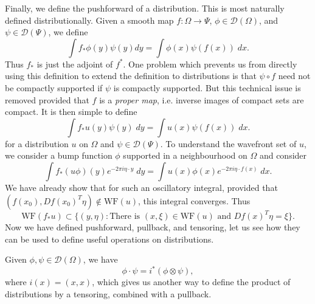 Finally, we define the pushforward of a distribution. This is most naturally defined distributionally. Given a smooth map $f: \Omega \to \Psi$, $\phi \in \mathcal{D}(\Omega)$, and $\psi \in \mathcal{D}(\Psi)$, we define
%
\[ \int f_* \phi(y) \psi(y) dy = \int \phi(x) \psi(f(x))\; dx. \]
%
Thus $f_*$ is just the adjoint of $f^*$. One problem which prevents us from directly using this definition to extend the definition to distributions is that $\psi \circ f$ need not be compactly supported if $\psi$ is compactly supported. But this technical issue is removed provided that $f$ is a \emph{proper map}, i.e. inverse images of compact sets are compact. It is then simple to define
%
\[ \int f_* u(y) \psi(y)\; dy = \int u(x) \psi(f(x))\; dx. \]
%
for a distribution $u$ on $\Omega$ and $\psi \in \mathcal{D}(\Psi)$. To understand the wavefront set of $u$, we consider a bump function $\phi$ supported in a neighbourhood  on $\Omega$ and consider
%
\[ \int f_*(u \phi)(y) e^{-2 \pi i \eta \cdot y}\; dy = \int u(x) \phi(x) e^{-2 \pi i \eta \cdot f(x)}\; dx. \]
%
We have already show that for such an oscillatory integral, provided that $(f(x_0),Df(x_0)^T \eta) \not \in \text{WF}(u)$, this integral converges. Thus
%
\[ \text{WF}(f_* u) \subset \{ (y,\eta) : \text{There is $(x,\xi) \in \text{WF}(u)$ and $Df(x)^T \eta = \xi$} \}. \]
%
Now we have defined pushforward, pullback, and tensoring, let us see how they can be used to define useful operations on distributions.

\begin{example}
    Given $\phi,\psi \in \mathcal{D}(\Omega)$, we have
    \[ \phi \cdot \psi = i^*(\phi \otimes \psi), \]
    where $i(x) = (x,x)$, which gives us another way to define the product of distributions by a tensoring, combined with a pullback.
\end{example}

